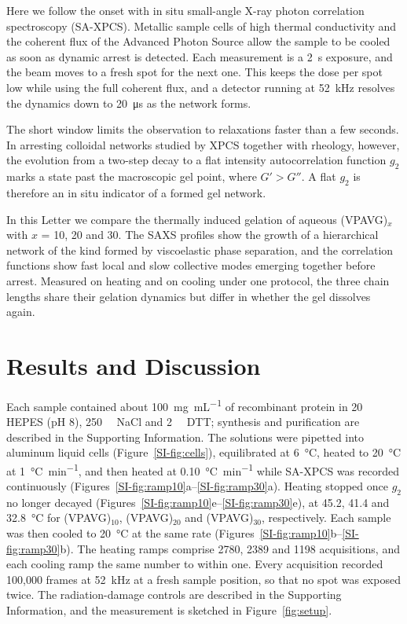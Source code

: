 \documentclass[journal=nalefd,manuscript=letter,layout=traditional]{achemso}
\newcommand{\VP}[1]{(VPAVG)$_{#1}$}
\begin{document}
Here we follow the onset with in situ small-angle X-ray photon correlation spectroscopy (SA-XPCS).\cite{Lehmkuhler2021-jx,Chushkin2025-qs} Metallic sample cells of high thermal conductivity and the coherent flux of the Advanced Photon Source allow the sample to be cooled as soon as dynamic arrest is detected. Each measurement is a \SI{2}{\second} exposure, and the beam moves to a fresh spot for the next one. This keeps the dose per spot low while using the full coherent flux, and a detector running at \SI{52}{\kilo\hertz} resolves the dynamics down to \SI{20}{\micro\second} as the network forms.\cite{Rao2020-qr,Chen2020-fn}

The short window limits the observation to relaxations faster than a few seconds. In arresting colloidal networks studied by XPCS together with rheology, however, the evolution from a two-step decay to a flat intensity autocorrelation function $g_2$ marks a state past the macroscopic gel point, where $G'>G''$.\cite{Zhang2017-ip} A flat $g_2$ is therefore an in situ indicator of a formed gel network.

In this Letter we compare the thermally induced gelation of aqueous \VP{x} with $x$ = 10, 20 and 30. The SAXS profiles show the growth of a hierarchical network of the kind formed by viscoelastic phase separation, and the correlation functions show fast local and slow collective modes emerging together before arrest.\cite{Tanaka2000-qq,Tanaka2006-tz} Measured on heating and on cooling under one protocol, the three chain lengths share their gelation dynamics but differ in whether the gel dissolves again.

\section*{Results and Discussion}

Each sample contained about \SI{100}{\milli\gram\per\milli\liter} of recombinant protein in \SI{20}{\milli\Molar} HEPES (pH 8), \SI{250}{\milli\Molar} NaCl and \SI{2}{\milli\Molar} DTT; synthesis and purification are described in the Supporting Information. The solutions were pipetted into aluminum liquid cells (Figure~\ref{SI-fig:cells}), equilibrated at \SI{6}{\degreeCelsius}, heated to \SI{20}{\degreeCelsius} at \SI{1}{\degreeCelsius\per\minute}, and then heated at \SI{0.10}{\degreeCelsius\per\minute} while SA-XPCS was recorded continuously (Figures~\ref{SI-fig:ramp10}a--\ref{SI-fig:ramp30}a). Heating stopped once $g_2$ no longer decayed (Figures~\ref{SI-fig:ramp10}e--\ref{SI-fig:ramp30}e), at 45.2, 41.4 and \SI{32.8}{\degreeCelsius} for \VP{10}, \VP{20} and \VP{30}, respectively. Each sample was then cooled to \SI{20}{\degreeCelsius} at the same rate (Figures~\ref{SI-fig:ramp10}b--\ref{SI-fig:ramp30}b). The heating ramps comprise 2780, 2389 and 1198 acquisitions, and each cooling ramp the same number to within one. Every acquisition recorded 100{,}000 frames at \SI{52}{\kilo\hertz} at a fresh sample position, so that no spot was exposed twice. The radiation-damage controls are described in the Supporting Information, and the measurement is sketched in Figure~\ref{fig:setup}.
\end{document}
